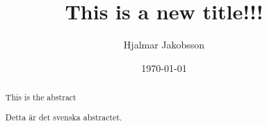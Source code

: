 \documentclass{kththesis}
\title{This is a new title!!!}
\author{Hjalmar Jakobsson}
\date{\today}
\begin{document}



\begin{abstract}
This is the abstract

\end{abstract}

\begin{otherlanguage}{swedish}
  \begin{abstract}
    Detta är det svenska abstractet.

  \end{abstract}
\end{otherlanguage}

\printglossary[type=\acronymtype,nonumberlist]

\tableofcontents
\let\cleardoublepage\clearpage
\mainmatter








\printbibliography[heading=bibnumbered, title=References]

\begin{appendices}

\end{appendices}


\end{document}
